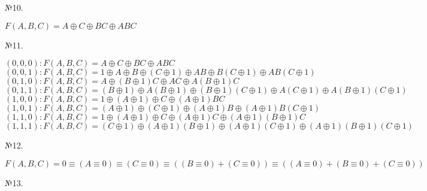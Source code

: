 \documentclass[a4paper,12pt]{report} %
\begin{document}
\newpage
\begin{center}
№10.
\end{center}
\begin{flushleft}
$ F(A,B,C)  = A \oplus C \oplus BC \oplus ABC$ 
\end{flushleft}
\bigskip
\begin{center}
№11.
\end{center}
$ (0,0,0): F(A,B,C) = A \oplus C \oplus BC \oplus ABC$  \\
$ (0,0,1): F(A,B,C) = 1 \oplus A \oplus B \oplus (C\oplus 1)\oplus AB \oplus B(C\oplus 1) \oplus AB(C\oplus1) $ \\
$ (0,1,0): F(A,B,C) = A \oplus (B\oplus 1)C \oplus AC \oplus A(B\oplus 1)C$ \\
$ (0,1,1): F(A,B,C) = (B\oplus 1) \oplus A(B \oplus 1) \oplus (B \oplus 1)(C \oplus 1) \oplus A(C \oplus 1) \oplus A(B\oplus 1)(C \oplus 1) $ \\
$ (1,0,0): F(A,B,C) = 1 \oplus (A \oplus 1) \oplus C \oplus (A \oplus 1)BC $ \\
$ (1,0,1): F(A,B,C) = (A \oplus 1) \oplus (C \oplus 1) \oplus (A \oplus 1)B \oplus (A \oplus 1)B(C \oplus 1) $ \\
$ (1,1,0): F(A,B,C) = 1 \oplus (A \oplus 1) \oplus C \oplus (A \oplus 1)C \oplus (A \oplus 1)(B \oplus 1)C$\\
$ (1,1,1): F(A,B,C) = (C \oplus 1) \oplus (A \oplus 1)(B \oplus 1)\oplus (A \oplus 1)(C \oplus 1) \oplus (A \oplus 1)(B \oplus 1)(C \oplus 1) $ \\
\begin{center} 
№12.  
\end{center} 
\begin{flushleft}
$ F(A,B,C) = 0 \equiv (A \equiv 0) \equiv (C \equiv 0) \equiv ((B \equiv 0)+(C \equiv 0)) \equiv ((A \equiv 0)+(B \equiv 0) + (C \equiv 0))$ \\
\end{flushleft}
\begin{center} 
№13.  
\end{center} 
\end{document}
